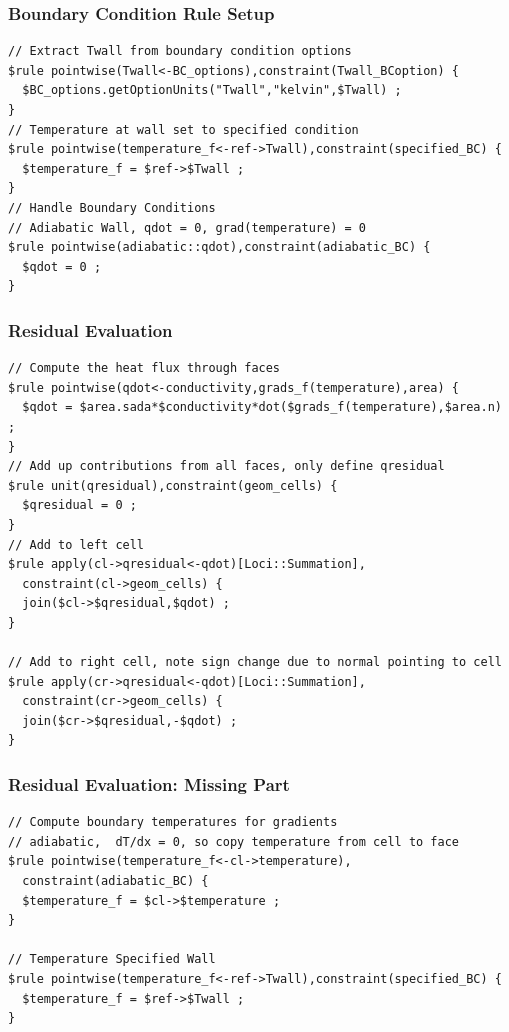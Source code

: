 \documentclass{beamer}
\begin{document}
\begin{frame}[fragile=singleslide]\frametitle{Boundary Condition Rule Setup}
\scriptsize
\begin{verbatim}
// Extract Twall from boundary condition options
$rule pointwise(Twall<-BC_options),constraint(Twall_BCoption) {
  $BC_options.getOptionUnits("Twall","kelvin",$Twall) ;
}
// Temperature at wall set to specified condition
$rule pointwise(temperature_f<-ref->Twall),constraint(specified_BC) {
  $temperature_f = $ref->$Twall ;
}
// Handle Boundary Conditions
// Adiabatic Wall, qdot = 0, grad(temperature) = 0
$rule pointwise(adiabatic::qdot),constraint(adiabatic_BC) {
  $qdot = 0 ;
}
\end{verbatim}
\end{frame}

\begin{frame}[fragile=singleslide]\frametitle{Residual Evaluation}
\scriptsize
\begin{verbatim}
// Compute the heat flux through faces
$rule pointwise(qdot<-conductivity,grads_f(temperature),area) {
  $qdot = $area.sada*$conductivity*dot($grads_f(temperature),$area.n) ;
}
// Add up contributions from all faces, only define qresidual 
$rule unit(qresidual),constraint(geom_cells) {
  $qresidual = 0 ;
}
// Add to left cell
$rule apply(cl->qresidual<-qdot)[Loci::Summation],
  constraint(cl->geom_cells) {
  join($cl->$qresidual,$qdot) ;
}

// Add to right cell, note sign change due to normal pointing to cell
$rule apply(cr->qresidual<-qdot)[Loci::Summation],
  constraint(cr->geom_cells) {
  join($cr->$qresidual,-$qdot) ;
}
\end{verbatim}
\end{frame}
\begin{frame}[fragile=singleslide]\frametitle{Residual Evaluation: Missing Part}
\scriptsize
\begin{verbatim}
// Compute boundary temperatures for gradients
// adiabatic,  dT/dx = 0, so copy temperature from cell to face
$rule pointwise(temperature_f<-cl->temperature),
  constraint(adiabatic_BC) {
  $temperature_f = $cl->$temperature ;
}

// Temperature Specified Wall
$rule pointwise(temperature_f<-ref->Twall),constraint(specified_BC) {
  $temperature_f = $ref->$Twall ;
}
\end{verbatim}
\end{frame}
\end{document}

